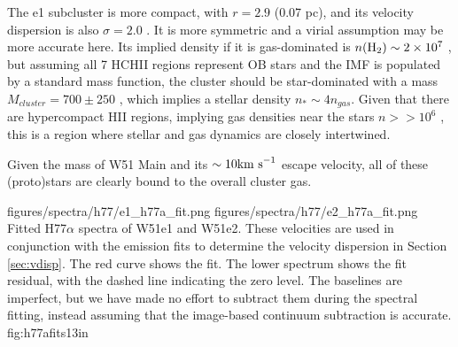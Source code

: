 The e1 subcluster is more compact, with $r=2.9$ \arcsec (0.07 pc), and its
velocity dispersion is also $\sigma=2.0$ \kms.  It is more symmetric and a virial
assumption may be more accurate here.  Its implied density if it is gas-dominated
is $n(\textrm{H}_{2})\sim2\times10^{7}$ \percc, but assuming all 7 HCHII regions represent OB
stars and the IMF is populated by a standard \citet{Kroupa2001a} mass function,
the cluster should be star-dominated with a mass $M_{cluster}=700\pm250$ \msun,
which implies a stellar density $n_* \sim 4 n_{gas}$.  Given that there are 
hypercompact HII regions, implying gas densities near the stars $n>>10^6$ \percc,
this is a region where stellar and gas dynamics are closely intertwined.

Given the mass of W51 Main and its $\sim10\textrm{km~s}^{-1}$ escape velocity, all of these
(proto)stars are clearly bound to the overall cluster gas. 

\FigureTwo
{figures/spectra/h77/e1_h77a_fit.png}
{figures/spectra/h77/e2_h77a_fit.png}
{Fitted H77$\alpha$ spectra of W51e1 and W51e2.  These velocities are used in
conjunction with the \formaldehyde emission fits to determine the velocity
dispersion in Section \ref{sec:vdisp}.
The red curve shows the fit.  The lower spectrum shows the fit residual, with
the dashed line indicating the zero level.  The baselines are imperfect, but we
have made no effort to subtract them during the spectral fitting, instead
assuming that the image-based continuum subtraction is accurate.
}
{fig:h77afits}{1}{3in}






